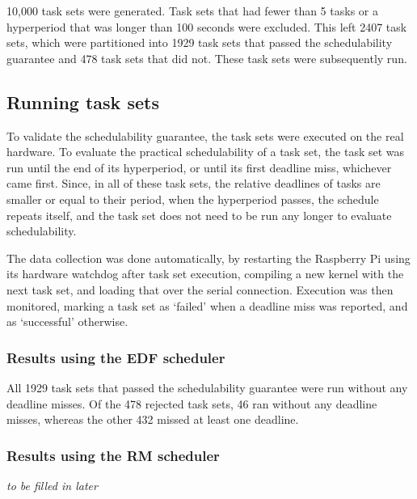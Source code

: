 10,000 task sets were generated. Task sets that had fewer than 5 tasks or a hyperperiod that was longer than 100 seconds were excluded. This left 2407 task sets, which were partitioned into 1929 task sets that passed the schedulability guarantee and 478 task sets that did not. These task sets were subsequently run.

\subsection{Running task sets}
To validate the schedulability guarantee, the task sets were executed on the real hardware. To evaluate the practical schedulability of a task set, the task set was run until the end of its hyperperiod, or until its first deadline miss, whichever came first. Since, in all of these task sets, the relative deadlines of tasks are smaller or equal to their period, when the hyperperiod passes, the schedule repeats itself, and the task set does not need to be run any longer to evaluate schedulability.

The data collection was done automatically, by restarting the Raspberry Pi using its hardware watchdog after task set execution, compiling a new kernel with the next task set, and loading that over the serial connection. Execution was then monitored, marking a task set as `failed' when a deadline miss was reported, and as `successful' otherwise.

\subsubsection{Results using the EDF scheduler}
All 1929 task sets that passed the schedulability guarantee were run without any deadline misses. Of the 478 rejected task sets, 46 ran without any deadline misses, whereas the other 432 missed at least one deadline.

\subsubsection{Results using the RM scheduler}

\emph{to be filled in later}
